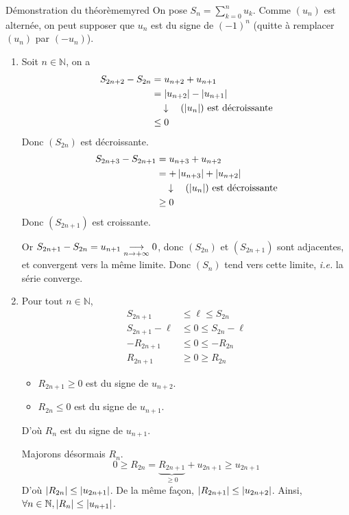     \begin{demo}{Démonstration du théorème}{myred}
        On pose $S_n = \sum_{k=0}^{n} u_k$. Comme $(u_n)$ est alternée, on peut supposer que $u_n$ est du signe de $(-1)^n$ (quitte à remplacer $(u_n)$ par $(-u_n)$).
        \begin{enumerate}
            \item Soit $n \in \mathbb{N}$, on a 
            \begin{align*}
                S_{2n+2} - S_{2n} 
                &= u_{n+2} + u_{n+1} \\
                &= \left\lvert u_{n+2}\right\rvert - \left\lvert u_{n+1}\right\rvert \\
                & \quad \downarrow \quad (\left\lvert u_n\right\rvert) \text{ est décroissante} \\
                &\leq 0
            \end{align*}
            Donc $(S_{2n})$ est décroissante.
            \begin{align*}
                S_{2n+3} - S_{2n+1} 
                &= u_{n+3} + u_{n+2} \\
                &= + \left\lvert u_{n+3}\right\rvert + \left\lvert u_{n+2}\right\rvert \\
                & \quad \downarrow \quad (\left\lvert u_n\right\rvert) \text{ est décroissante} \\
                &\geq 0
            \end{align*}
            Donc $(S_{2n+1})$ est croissante.

            Or $S_{2n+1} - S_{2n} = u_{n+1} \underset{n \rightarrow +\infty}{\longrightarrow} 0$, donc $(S_{2n})$ et $(S_{2n+1})$ sont adjacentes, et convergent vers la même limite. Donc $(S_n)$ tend vers cette limite, \textit{i.e.} la série converge.
            \item Pour tout $n \in \mathbb{N}$, 
            \begin{align*}
                S_{2n+1} &\leq \ell \leq S_{2n} \\
                S_{2n+1} - \ell &\leq 0 \leq S_{2n} - \ell \\
                - R_{2n+1} &\leq 0 \leq -R_{2n} \\
                R_{2n+1} &\geq 0 \geq R_{2n}
            \end{align*}
            \begin{itemize}
                \item $R_{2n+1} \geq 0$ est du signe de $u_{n+2}$.
                \item $R_{2n} \leq 0$ est du signe de $u_{n+1}$.
            \end{itemize}
            D’où $R_n$ est du signe de $u_{n+1}$.

            Majorons désormais $R_n$. 
            \[ 0 \geq R_{2n} = \underbrace{R_{2n+1}}_{\geq 0} + u_{2n+1} \geq u_{2n+1} \] 
            D’où $\left\lvert R_{2n}\right\rvert \leq \left\lvert u_{2n+1}\right\rvert$. De la même façon, $\left\lvert R_{2n+1}\right\rvert \leq \left\lvert u_{2n+2}\right\rvert$. Ainsi, $\forall n \in \mathbb{N}, \left\lvert R_n\right\rvert \leq \left\lvert u_{n+1}\right\rvert$.
        \end{enumerate}
    \end{demo}

